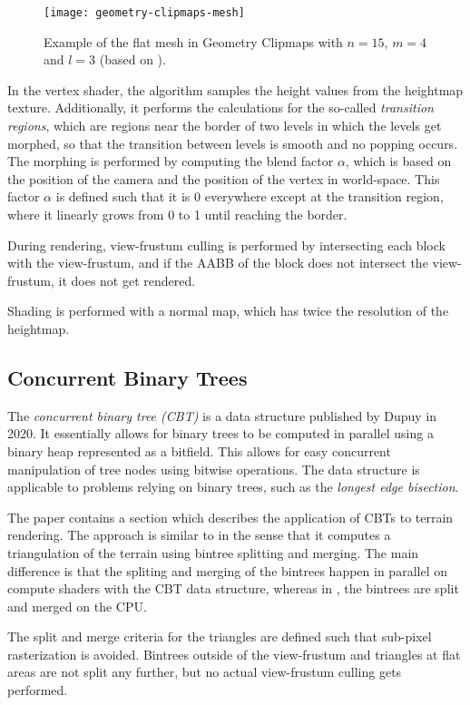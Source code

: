 \begin{figure}[H]
  \centering
  \texttt{[image: geometry-clipmaps-mesh]}
  \caption{Example of the flat mesh in Geometry Clipmaps with $n = 15$, $m = 4$ and $l = 3$ (based on \cite{gpugeomclipmaps}).}\label{fig:geometry-clipmaps-mesh}
\end{figure}

In the vertex shader, the algorithm samples the height values from the heightmap texture.
Additionally, it performs the calculations for the so-called \textit{transition regions}, 
which are regions near the border of two levels in which 
the levels get morphed, so that the transition between levels is smooth and no popping occurs.
The morphing is performed by computing the blend factor $\alpha$,
which is based on the position of the camera and the position of the vertex in world-space.
This factor $\alpha$ is defined such that it is 0 everywhere except at the transition region,
where it linearly grows from 0 to 1 until reaching the border.

During rendering, view-frustum culling is performed by intersecting each block with the view-frustum,
and if the AABB of the block does not intersect the view-frustum, it does not get rendered.

Shading is performed with a normal map, which has twice the resolution of the heightmap.

\subsection{Concurrent Binary Trees}
The \textit{concurrent binary tree (CBT)} \cite{cbt} is a data structure published by Dupuy in 2020.
It essentially allows for binary trees to be computed in parallel using a binary heap 
represented as a bitfield. This allows for easy concurrent manipulation of tree nodes using bitwise operations.
The data structure is applicable to problems relying on binary trees, 
such as the \textit{longest edge bisection}.

The paper contains a section which describes the application of CBTs to terrain rendering.
The approach is similar to \cite{roam} in the sense that it computes a triangulation of the terrain using bintree splitting and merging.
The main difference is that the spliting and merging of the bintrees happen in parallel on compute shaders with the 
CBT data structure, whereas in \cite{roam}, the bintrees are split and merged on the CPU.

The split and merge criteria for the triangles are defined such that sub-pixel rasterization is avoided.
Bintrees outside of the view-frustum and triangles at flat areas are not split any further,
but no actual view-frustum culling gets performed.

